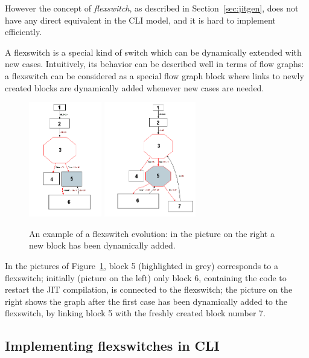 However the concept of \emph{flexswitch}, as described in
Section~\ref{sec:jitgen}, does not have any direct equivalent
in the CLI model, and it is hard to implement efficiently.

A flexswitch is a special kind of switch which can be dynamically
extended with new cases.  Intuitively, its behavior can be described
well in terms of flow graphs: a flexswitch can be considered 
as a special flow graph block where links to newly created blocks are
dynamically added whenever new cases are needed. 

\begin{figure}[h]
\begin{center}
\includegraphics[height=5cm]{flexswitch1}
\includegraphics[height=5cm]{flexswitch2}
\caption{An example of a flexswitch evolution: in the picture on the
  right a new block has been dynamically added.}\label{flexswitch-fig}
\end{center}
\end{figure}

In the pictures of Figure~\ref{flexswitch-fig}, block 5 (highlighted in grey)
corresponds to a flexswitch; initially (picture on the left) 
only block 6, containing the code to restart the JIT compilation,
is connected to the flexswitch; the picture on the right
shows the graph after the first case has been dynamically added to the flexswitch,
by linking block 5 with the freshly created block number 7.


\subsection{Implementing flexswitches in CLI}
\label{sec:flexswitches-cli}

